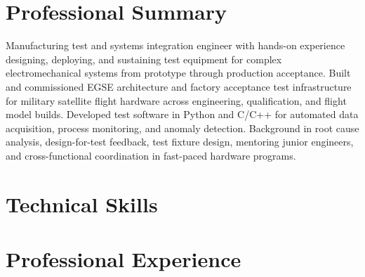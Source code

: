 \documentclass[letterpaper,11pt]{moderncv}
\begin{document}
\makecvtitle
\vspace{-3em}

\section{Professional Summary}
Manufacturing test and systems integration engineer with hands-on experience designing, deploying, and sustaining test equipment for complex electromechanical systems from prototype through production acceptance. Built and commissioned EGSE architecture and factory acceptance test infrastructure for military satellite flight hardware across engineering, qualification, and flight model builds. Developed test software in Python and C/C++ for automated data acquisition, process monitoring, and anomaly detection. Background in root cause analysis, design-for-test feedback, test fixture design, mentoring junior engineers, and cross-functional coordination in fast-paced hardware programs.

\section{Technical Skills}
\begin{minipage}[t]{0.48\textwidth}
\end{minipage}%
\hfill
\begin{minipage}[t]{0.48\textwidth}
\end{minipage}

\section{Professional Experience}
\end{document}
